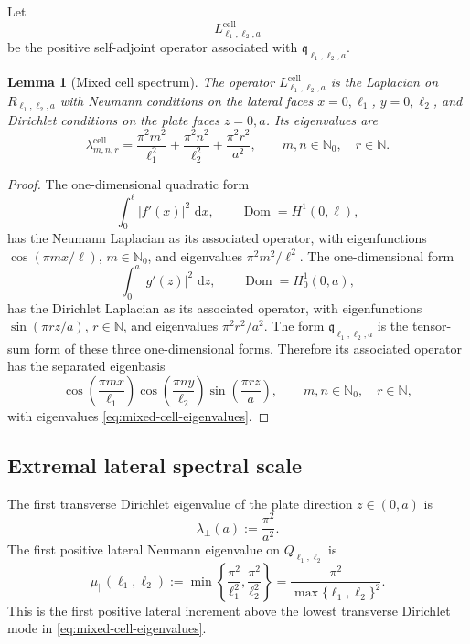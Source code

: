\documentclass[11pt]{article}
\newtheorem{lemma}[theorem]{Lemma}
\newcommand{\Dom}{\operatorname{Dom}}
\newcommand{\dd}{\,\mathrm{d}}
\begin{document}
Let
\[
    L_{\ell_1,\ell_2,a}^{\mathrm{cell}}
\]
be the positive self-adjoint operator associated with
\(\mathfrak q_{\ell_1,\ell_2,a}\).

\begin{lemma}[Mixed cell spectrum]
\label{lem:mixed-cell-spectrum}
The operator \(L_{\ell_1,\ell_2,a}^{\mathrm{cell}}\) is the Laplacian on
\(R_{\ell_1,\ell_2,a}\) with Neumann conditions on the lateral faces
\(x=0,\ell_1\), \(y=0,\ell_2\), and Dirichlet conditions on the plate faces
\(z=0,a\).  Its eigenvalues are
\begin{equation}
    \lambda_{m,n,r}^{\mathrm{cell}}
    =
    \frac{\pi^2m^2}{\ell_1^2}
    +
    \frac{\pi^2n^2}{\ell_2^2}
    +
    \frac{\pi^2r^2}{a^2},
    \qquad
    m,n\in\mathbb N_0,\quad r\in\mathbb N.
    \label{eq:mixed-cell-eigenvalues}
\end{equation}
\end{lemma}

\begin{proof}
The one-dimensional quadratic form
\[
    \int_0^\ell |f'(x)|^2\,\dd x,
    \qquad
    \Dom=H^1(0,\ell),
\]
has the Neumann Laplacian as its associated operator, with eigenfunctions
\(\cos(\pi m x/\ell)\), \(m\in\mathbb N_0\), and eigenvalues
\(\pi^2m^2/\ell^2\).  The one-dimensional form
\[
    \int_0^a |g'(z)|^2\,\dd z,
    \qquad
    \Dom=H^1_0(0,a),
\]
has the Dirichlet Laplacian as its associated operator, with eigenfunctions
\(\sin(\pi r z/a)\), \(r\in\mathbb N\), and eigenvalues
\(\pi^2r^2/a^2\).  The form
\(\mathfrak q_{\ell_1,\ell_2,a}\) is the tensor-sum form of these three
one-dimensional forms.  Therefore its associated operator has the separated
eigenbasis
\[
    \cos\!\left(\frac{\pi m x}{\ell_1}\right)
    \cos\!\left(\frac{\pi n y}{\ell_2}\right)
    \sin\!\left(\frac{\pi r z}{a}\right),
    \qquad
    m,n\in\mathbb N_0,\quad r\in\mathbb N,
\]
with eigenvalues \eqref{eq:mixed-cell-eigenvalues}.
\end{proof}

\subsection{Extremal lateral spectral scale}
\label{sec:extremal-lateral-scale}

The first transverse Dirichlet eigenvalue of the plate direction
\(z\in(0,a)\) is
\begin{equation}
    \lambda_\perp(a)
    :=
    \frac{\pi^2}{a^2}.
    \label{eq:first-transverse-dirichlet-scale}
\end{equation}
The first positive lateral Neumann eigenvalue on
\(Q_{\ell_1,\ell_2}\) is
\begin{equation}
    \mu_\parallel(\ell_1,\ell_2)
    :=
    \min\left\{
        \frac{\pi^2}{\ell_1^2},
        \frac{\pi^2}{\ell_2^2}
    \right\}
    =
    \frac{\pi^2}{\max\{\ell_1,\ell_2\}^2}.
    \label{eq:first-lateral-neumann-scale}
\end{equation}
This is the first positive lateral increment above the lowest transverse
Dirichlet mode in \eqref{eq:mixed-cell-eigenvalues}.
\end{document}
